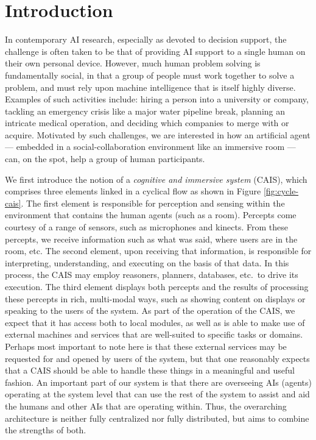 \section{Introduction}

In contemporary AI research, especially as devoted to decision
support, the challenge is often taken to be that of providing AI
support to a single human on their own personal device. However, much
human problem solving is fundamentally social, in that a group of
people must work together to solve a problem, and must rely upon
machine intelligence that is itself highly diverse.  Examples of such
activities include: hiring a person into a university or company,
tackling an emergency crisis like a major water pipeline break,
planning an intricate medical operation, and deciding which companies
to merge with or acquire.  Motivated by such challenges, we are
interested in how an artificial agent --- embedded in a
social-collaboration environment like an immersive room --- can, on
the spot, help a group of human participants.

We first introduce the notion of a \emph{cognitive and immersive
  system} (CAIS), which comprises three elements linked in a cyclical
flow as shown in Figure \ref{fig:cycle-cais}.  The first element is
responsible for perception and sensing within the environment that
contains the human agents (such as a room). Percepts come courtesy of
a range of sensors, such as microphones and kinects. From these
percepts, we receive information such as what was said, where users
are in the room, etc. The second element, upon receiving that
information, is responsible for interpreting, understanding, and
executing on the basis of that data. In this process, the CAIS may
employ reasoners, planners, databases, etc.\ to drive its
execution. The third element displays both percepts and the results of
processing these percepts in rich, multi-modal ways, such as showing
content on displays or speaking to the users of the system. As part of
the operation of the CAIS, we expect that it has access both to local
modules, as well as is able to make use of external machines and
services that are well-suited to specific tasks or domains. Perhaps
most important to note here is that these external services may be
requested for and opened by users of the system, but that one
reasonably expects that a CAIS should be able to handle these things
in a meaningful and useful fashion.
An important part of our system is that there are overseeing AIs
(agents) operating at the system level that can use the rest of the
system to assist and aid the humans and other AIs that are operating
within.  Thus, the overarching architecture is neither fully
centralized nor fully distributed, but aims to combine the strengths
of both.

